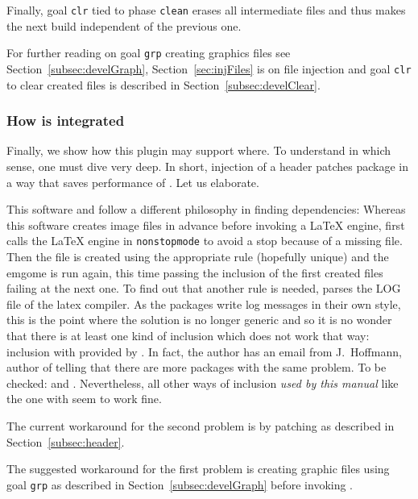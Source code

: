 Finally, goal \texttt{clr} tied to phase \texttt{clean} erases all intermediate files 
and thus makes the next build independent of the previous one. 


For further reading on goal \texttt{grp} creating graphics files 
see Section~\ref{subsec:develGraph}, 
Section~\ref{sec:injFiles} is on file injection and 
goal \texttt{clr} to clear created files is 
described in Section~\ref{subsec:develClear}. 
\medskip

\subsubsection{How  is integrated}\label{subsubsec:latexmkIntegration}

Finally, we show how this plugin may support  where. 
To understand in which sense, one must dive very deep. 
In short, injection of a header patches package  
in a way that saves performance of . 
Let us elaborate. 

This software and  follow a different philosophy in finding dependencies: 
Whereas this software creates image files in advance before invoking a \LaTeX{} engine, 
 first calls the \LaTeX{} engine in \texttt{nonstopmode} 
to avoid a stop because of a missing file. 
Then the file is created using the appropriate rule (hopefully unique) 
and the emgome is run again, 
this time passing the inclusion of the first created files 
failing at the next one. 
To find out that another rule is needed,  parses the LOG file of the latex compiler. 
As the packages write log messages in their own style, 
this is the point where the solution is no longer generic 
and so it is no wonder that there is at least one kind of inclusion which does not work that way: 
inclusion with  provided by . 
In fact, the author has an email from J.~Hoffmann, author of  
telling that there are more packages with the same problem. 
To be checked:  and . 
Nevertheless, all other ways of inclusion \emph{used by this manual} 
like the one with  seem to work fine. 

The current workaround for the second problem 
is by patching  as described in Section~\ref{subsec:header}.

The suggested workaround for the first problem is 
creating graphic files using goal \texttt{grp} as described in Section~\ref{subsec:develGraph} 
before invoking . 


